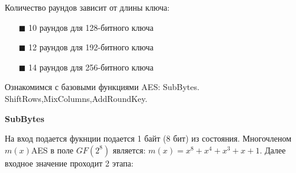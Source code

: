 \documentclass[colorthm]{./civarticle}
\begin{document}
Количество раундов зависит от длины ключа: 

\begin{itemize}
    \item[$\blacksquare$] 10 раундов для 128-битного ключа
    \item[$\blacksquare$] 12 раундов для 192-битного ключа
    \item[$\blacksquare$] 14 раундов для 256-битного ключа
\end{itemize}

Ознакомимся с базовыми функциями AES: SubBytes. ShiftRows,MixColumns,AddRoundKey.

\textbf{SubBytes}

На вход подается фукнции подается 1 байт (8 бит) из состояния. Многочленом $m(x) $AES в поле $GF(2^8)$ является: $m(x) = x^8+x^4+x^3+x+1$. Далее входное значение проходит 2 этапа:
\end{document}
